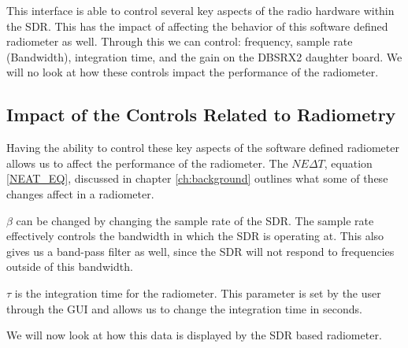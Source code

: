 This interface is able to control several key aspects of the radio hardware within the SDR.  This has the impact of affecting the behavior of this software defined radiometer as well.  Through this we can control: frequency, sample rate (Bandwidth), integration time, and the gain on the DBSRX2 daughter board.  We will no look at how these controls impact the performance of the radiometer.  

\subsection{Impact of the Controls Related to Radiometry}

Having the ability to control these key aspects of the software defined radiometer allows us to affect the performance of the radiometer.  The $NE\Delta T$, equation \ref{NEAT_EQ}, discussed in chapter \ref{ch:background} outlines what some of these changes affect in a radiometer.


$\beta$ can be changed by changing the sample rate of the SDR.  The sample rate effectively controls the bandwidth in which the SDR is operating at.  This also gives us a band-pass filter as well, since the SDR will not respond to frequencies outside of this bandwidth.  

$\tau$ is the integration time for the radiometer.  This parameter is set by the user through the GUI and allows us to change the integration time in seconds.

We will now look at how this data is displayed by the SDR based radiometer.


